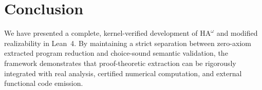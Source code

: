 \documentclass[11pt,a4paper]{article}
\theoremstyle{definition}
\theoremstyle{remark}
\newcommand{\HAomega}{\ensuremath{\mathrm{HA}^\omega}}
\begin{document}
\section{Conclusion}

We have presented a complete, kernel-verified development of $\HAomega$ and modified realizability in Lean~4. By maintaining a strict separation between zero-axiom extracted program reduction and choice-sound semantic validation, the framework demonstrates that proof-theoretic extraction can be rigorously integrated with real analysis, certified numerical computation, and external functional code emission.



\end{document}
